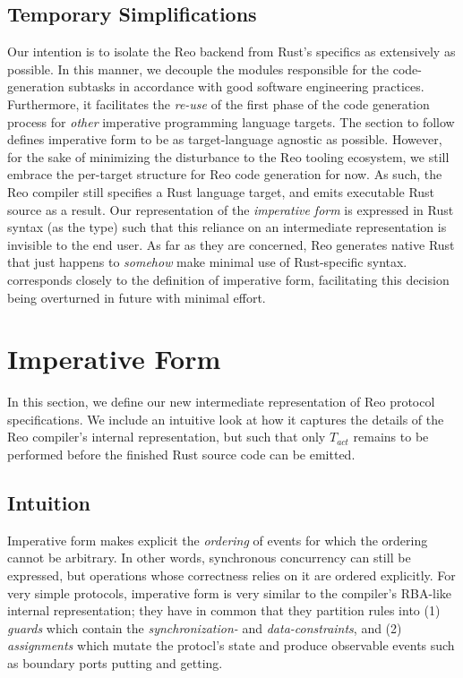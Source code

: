 \subsection{Temporary Simplifications}
Our intention is to isolate the Reo backend from Rust's specifics as extensively as possible. In this manner, we decouple the modules responsible for the code-generation subtasks in accordance with good software engineering practices. Furthermore, it facilitates the \textit{re-use} of the first phase of the code generation process for \textit{other} imperative programming language targets. The section to follow defines imperative form to be as target-language agnostic as possible. However, for the sake of minimizing the disturbance to the Reo tooling ecosystem, we still embrace the per-target structure for Reo code generation for now. As such, the Reo compiler still specifies a Rust language target, and emits executable Rust source as a result. Our representation of the \textit{imperative form} is expressed in Rust syntax (as the  type) such that this reliance on an intermediate representation is invisible to the end user. As far as they are concerned, Reo generates native Rust that just happens to \textit{somehow} make minimal use of Rust-specific syntax.  corresponds closely to the definition of imperative form, facilitating this decision being overturned in future with minimal effort.


\section{Imperative Form}
In this section, we define our new intermediate representation of Reo protocol specifications. We include an intuitive look at how it captures the details of the Reo compiler's internal representation, but such that only $T_{act}$ remains to be performed before the finished Rust source code can be emitted.


\subsection{Intuition}
Imperative form makes explicit the \textit{ordering} of events for which the ordering cannot be arbitrary. In other words, synchronous concurrency can still be expressed, but operations whose correctness relies on it are ordered explicitly. For very simple protocols, imperative form is very similar to the compiler's RBA-like internal representation; they have in common that they partition rules into (1) \textit{guards} which contain the \textit{synchronization-} and \textit{data-constraints}, and (2) \textit{assignments} which mutate the protocl's state and produce observable events such as boundary ports putting and getting. 

